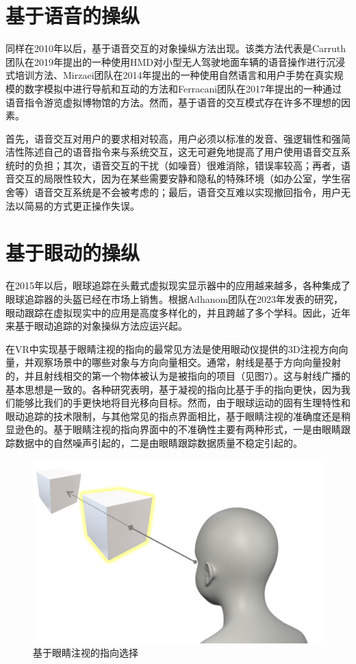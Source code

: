 \section{基于语音的操纵}

同样在2010年以后，基于语音交互的对象操纵方法出现。该类方法代表是Carruth团队在2019年提出的一种使用HMD对小型无人驾驶地面车辆的语音操作进行沉浸式培训方法、Mirzaei团队在2014年提出的一种使用自然语言和用户手势在真实规模的数字模拟中进行导航和互动的方法和Ferracani团队在2017年提出的一种通过语音指令游览虚拟博物馆的方法。然而，基于语音的交互模式存在许多不理想的因素。

首先，语音交互对用户的要求相对较高，用户必须以标准的发音、强逻辑性和强简洁性陈述自己的语音指令来与系统交互，这无可避免地提高了用户使用语音交互系统时的负担；其次，语音交互的干扰（如噪音）很难消除，错误率较高；再者，语音交互的局限性较大，因为在某些需要安静和隐私的特殊环境（如办公室，学生宿舍等）语音交互系统是不会被考虑的；最后，语音交互难以实现撤回指令，用户无法以简易的方式更正操作失误。

\section{基于眼动的操纵}

在2015年以后，眼球追踪在头戴式虚拟现实显示器中的应用越来越多，各种集成了眼球追踪器的头盔已经在市场上销售。根据Adhanom团队在2023年发表的研究，眼动跟踪在虚拟现实中的应用是高度多样化的，并且跨越了多个学科。因此，近年来基于眼动追踪的对象操纵方法应运兴起。

在VR中实现基于眼睛注视的指向的最常见方法是使用眼动仪提供的3D注视方向向量，并观察场景中的哪些对象与方向向量相交。通常，射线是基于方向向量投射的，并且射线相交的第一个物体被认为是被指向的项目（见图7）。这与射线广播的基本思想是一致的。各种研究表明，基于凝视的指向比基于手的指向更快，因为我们能够比我们的手更快地将目光移向目标。然而，由于眼球运动的固有生理特性和眼动追踪的技术限制，与其他常见的指点界面相比，基于眼睛注视的准确度还是稍显逊色的。基于眼睛注视的指向界面中的不准确性主要有两种形式，一是由眼睛跟踪数据中的自然噪声引起的，二是由眼睛跟踪数据质量不稳定引起的。

\begin{figure}[b!]
    \centering
    \includegraphics[width=.45\textwidth]{figure/gazing_raycasting.png}
    \caption{基于眼睛注视的指向选择}
    \label{fig-6}
\end{figure}

